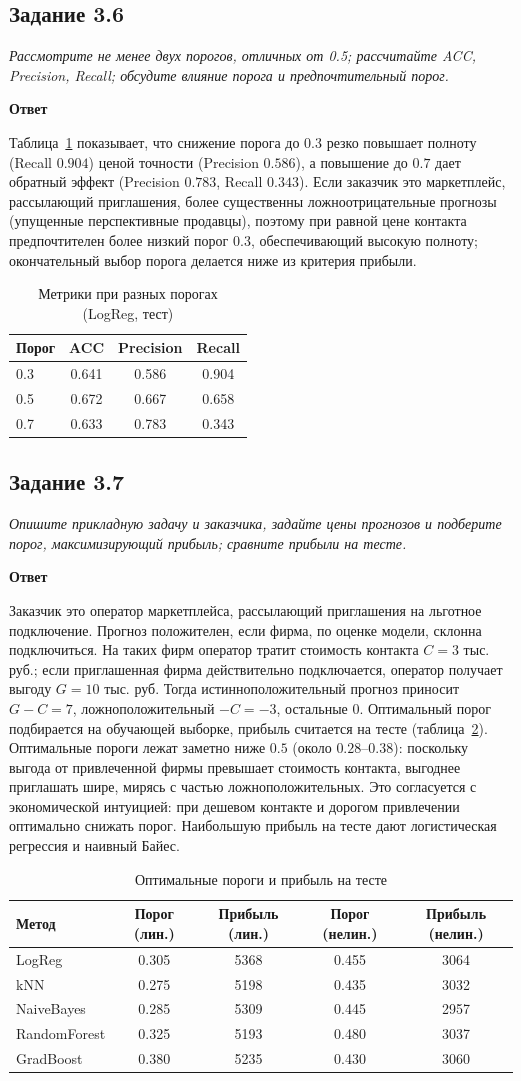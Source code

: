 \documentclass[12pt,a4paper]{article}
\newcommand{\zadanie}[2]{\subsection*{Задание #1}\begingroup\itshape #2\par\endgroup\medskip}
\newcommand{\otvet}{\par\noindent\textbf{Ответ}\par\medskip}
\begin{document}
\zadanie{3.6}{Рассмотрите не менее двух порогов, отличных от 0.5; рассчитайте ACC, Precision, Recall; обсудите влияние порога и предпочтительный порог.}
\otvet
Таблица~\ref{tab:thresholds} показывает, что снижение порога до $0.3$ резко повышает полноту (Recall $0.904$) ценой точности (Precision $0.586$), а повышение до $0.7$ дает обратный эффект (Precision $0.783$, Recall $0.343$). Если заказчик это маркетплейс, рассылающий приглашения, более существенны ложноотрицательные прогнозы (упущенные перспективные продавцы), поэтому при равной цене контакта предпочтителен более низкий порог $0.3$, обеспечивающий высокую полноту; окончательный выбор порога делается ниже из критерия прибыли.

\begin{table}[H]\centering
\caption{Метрики при разных порогах (LogReg, тест)}\label{tab:thresholds}
\begin{tabular}{lccc}\toprule
Порог & ACC & Precision & Recall\\\midrule
0.3 & 0.641 & 0.586 & 0.904\\
0.5 & 0.672 & 0.667 & 0.658\\
0.7 & 0.633 & 0.783 & 0.343\\\bottomrule
\end{tabular}
\end{table}

\zadanie{3.7}{Опишите прикладную задачу и заказчика, задайте цены прогнозов и подберите порог, максимизирующий прибыль; сравните прибыли на тесте.}
\otvet
Заказчик это оператор маркетплейса, рассылающий приглашения на льготное подключение. Прогноз положителен, если фирма, по оценке модели, склонна подключиться. На таких фирм оператор тратит стоимость контакта $C=3$ тыс. руб.; если приглашенная фирма действительно подключается, оператор получает выгоду $G=10$ тыс. руб. Тогда истинноположительный прогноз приносит $G-C=7$, ложноположительный $-C=-3$, остальные $0$. Оптимальный порог подбирается на обучающей выборке, прибыль считается на тесте (таблица~\ref{tab:profit}). Оптимальные пороги лежат заметно ниже $0.5$ (около $0.28$--$0.38$): поскольку выгода от привлеченной фирмы превышает стоимость контакта, выгоднее приглашать шире, мирясь с частью ложноположительных. Это согласуется с экономической интуицией: при дешевом контакте и дорогом привлечении оптимально снижать порог. Наибольшую прибыль на тесте дают логистическая регрессия и наивный Байес.

\begin{table}[H]\centering\small
\caption{Оптимальные пороги и прибыль на тесте}\label{tab:profit}
\begin{tabular}{lcccc}\toprule
Метод & Порог (лин.) & Прибыль (лин.) & Порог (нелин.) & Прибыль (нелин.)\\\midrule
LogReg & 0.305 & 5368 & 0.455 & 3064\\
kNN & 0.275 & 5198 & 0.435 & 3032\\
NaiveBayes & 0.285 & 5309 & 0.445 & 2957\\
RandomForest & 0.325 & 5193 & 0.480 & 3037\\
GradBoost & 0.380 & 5235 & 0.430 & 3060\\\bottomrule
\end{tabular}
\end{table}
\end{document}

